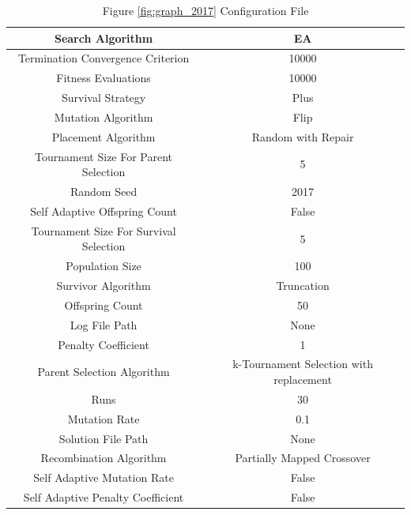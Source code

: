\documentclass{standalone}
\begin{document}
\begin{table}[!htb]
	\centering
	\caption{Figure \ref{fig:graph_2017} Configuration File}
	\label{tab:graph_2017}
	\begin{tabular}{| c | c |}
		\hline
		Search Algorithm		& EA		 \\
		\hline
		Termination Convergence Criterion		& 10000		 \\
		\hline
		Fitness Evaluations		& 10000		 \\
		\hline
		Survival Strategy		& Plus		 \\
		\hline
		Mutation Algorithm		& Flip		 \\
		\hline
		Placement Algorithm		& Random with Repair		 \\
		\hline
		Tournament Size For Parent Selection		& 5		 \\
		\hline
		Random Seed		& 2017		 \\
		\hline
		Self Adaptive Offspring Count		& False		 \\
		\hline
		Tournament Size For Survival Selection		& 5		 \\
		\hline
		Population Size		& 100		 \\
		\hline
		Survivor Algorithm		& Truncation		 \\
		\hline
		Offspring Count		& 50		 \\
		\hline
		Log File Path		& None		 \\
		\hline
		Penalty Coefficient		& 1		 \\
		\hline
		Parent Selection Algorithm		& k-Tournament Selection with replacement		 \\
		\hline
		Runs		& 30		 \\
		\hline
		Mutation Rate		& 0.1		 \\
		\hline
		Solution File Path		& None		 \\
		\hline
		Recombination Algorithm		& Partially Mapped Crossover		 \\
		\hline
		Self Adaptive Mutation Rate		& False		 \\
		\hline
		Self Adaptive Penalty Coefficient		& False		 \\
		\hline
	\end{tabular}
\end{table}
\end{document}
